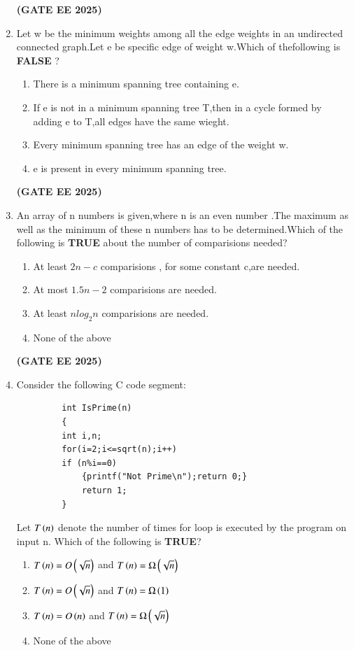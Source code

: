 \documentclass[journal,12pt,onecolumn]{IEEEtran}
\theoremstyle{remark}
\begin{document}
\begin{enumerate}
\begin{enumerate}
 \end{enumerate}
     \hfill \textbf{(GATE EE 2025)}
      
     \item Let w be the minimum weights among all the edge weights in an undirected connected graph.Let e be specific edge of weight w.Which of thefollowing is \textbf{FALSE} ?
     \begin{enumerate}
         \item There is a minimum spanning tree containing e.
         \item If e is not in a minimum spanning tree T,then in a cycle formed by adding e to T,all edges have the same wieght.
         \item Every minimum spanning tree has an edge of the weight w.
         \item e is present in every minimum spanning tree.
     \end{enumerate}
     \hfill \textbf{(GATE EE 2025)}
     \item An array of n numbers is given,where n is an even number .The maximum as well as the minimum of these n numbers has to be determined.Which of the following is \textbf{TRUE} about the number of comparisions needed?
     \begin{enumerate}
         \item  At least $2n-c$ comparisions , for some constant c,are needed.
         \item At most $1.5n-2$ comparisions are needed.
         \item At least $nlog_2 n$ comparisions are needed.
         \item None of the above 
     \end{enumerate}
     \hfill \textbf{(GATE EE 2025)}
     \item Consider the following C code segment:
     \begin{verbatim}
         int IsPrime(n)
         {
         int i,n;
         for(i=2;i<=sqrt(n);i++)
         if (n%i==0)
             {printf("Not Prime\n");return 0;}
             return 1;
         }
     \end{verbatim}
     Let $T\left(n\right)$ denote the number of times for loop is executed by the program on input n. Which of the following is \textbf{TRUE}?
     \begin{enumerate}
         \item $T\left(n\right)=O\left(\sqrt{n}\right)$ and $T\left(n\right)=\ohm\left(\sqrt{n}\right)$
         \item $T\left(n\right)=O\left(\sqrt{n}\right)$ and $T\left(n\right)=\ohm\left(1\right)$
         \item $T\left(n\right)=O\left(n\right)$ and $T\left(n\right)=\ohm\left(\sqrt{n}\right)$
         \item None of the above 
         

\end{enumerate}
\end{enumerate}
\end{document}
